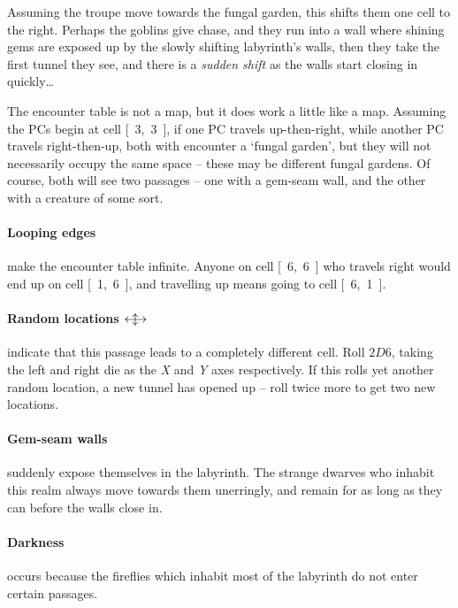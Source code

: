 \begin{multicols}{2}
\begin{exampletext}
  Assuming the troupe move towards the fungal garden, this shifts them one cell to the right.
  Perhaps the goblins give chase, and they run into a wall where shining gems are exposed up by the slowly shifting labyrinth's walls, then they take the first tunnel they see, and there is a \textit{sudden shift} as the walls start closing in quickly\ldots
\end{exampletext}

The encounter table is not a map, but it does work a little like a map.
Assuming the PCs begin at cell \mbox{[ 3, 3 ]}, if one PC travels up-then-right, while another PC travels right-then-up, both with encounter a `fungal garden', but they will not necessarily occupy the same space -- these may be different fungal gardens.
Of course, both will see two passages -- one with a gem-seam wall, and the other with a creature of some sort.

\paragraph{Looping edges}
make the encounter table infinite.
Anyone on cell \mbox{[ 6, 6 ]} who travels right would end up on cell \mbox{[ 1, 6 ]}, and travelling up means going to cell \mbox{[ 6, 1 ]}.

\paragraph{Random locations $\longleftrightarrow\hspace{-1.2em}\updownarrow$}
indicate that this passage leads to a completely different cell.
Roll $2D6$, taking the left and right die as the \textit{X} and \textit{Y} axes respectively.
If this rolls yet another random location, a new tunnel has opened up -- roll twice more to get two new locations.

\paragraph{Gem-seam walls}
suddenly expose themselves in the labyrinth.
The strange dwarves who inhabit this realm always move towards them unerringly, and remain for as long as they can before the walls close in.

\paragraph{Darkness}
occurs because the fireflies which inhabit most of the labyrinth do not enter certain passages.


\end{multicols}
